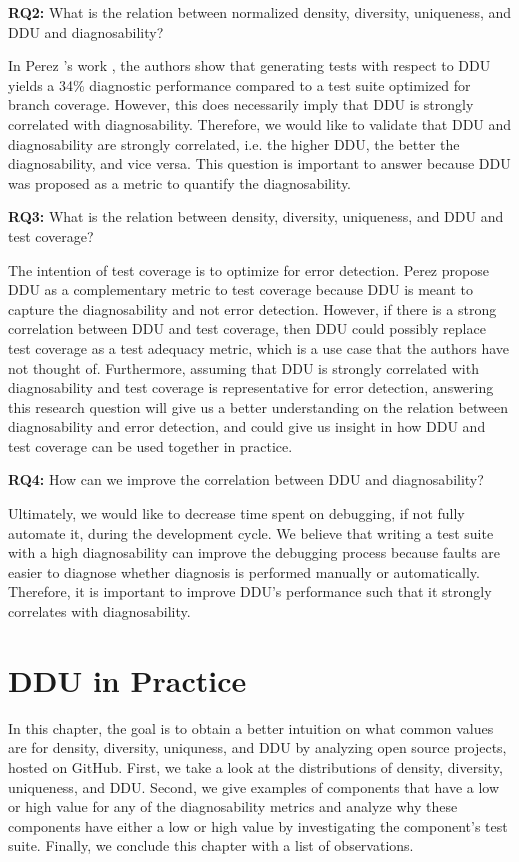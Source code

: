 \documentclass[twoside,a4paper,11pt]{memoir}
\begin{document}
\begin{framed}
\noindent
\textbf{RQ2:} What is the relation between normalized density, diversity, uniqueness, and DDU and diagnosability?
\end{framed}
In Perez \etal's work \cite{DBLP:conf/icse/PerezAD17}, the authors show that generating tests with respect to DDU yields a 34\% diagnostic performance compared to a test suite optimized for branch coverage.
However, this does necessarily imply that DDU is strongly correlated with diagnosability.
Therefore, we would like to validate that DDU and diagnosability are strongly correlated, i.e. the higher DDU, the better the diagnosability, and vice versa.
This question is important to answer because DDU was proposed as a metric to quantify the diagnosability.

\begin{framed}
\noindent
\textbf{RQ3:} What is the relation between density, diversity, uniqueness, and DDU and test coverage?
\end{framed}
The intention of test coverage is to optimize for error detection.
Perez \etal \cite{DBLP:conf/icse/PerezAD17} propose DDU as a complementary metric to test coverage because DDU is meant to capture the diagnosability and not error detection.
However, if there is a strong correlation between DDU and test coverage, then DDU could possibly replace test coverage as a test adequacy metric, which is a use case that the authors have not thought of.
Furthermore, assuming that DDU is strongly correlated with diagnosability and test coverage is representative for error detection, answering this research question will give us a better understanding on the relation between diagnosability and error detection, and could give us insight in how DDU and test coverage can be used together in practice.

\begin{framed}
\noindent
\textbf{RQ4:} How can we improve the correlation between DDU and diagnosability?
\end{framed}
Ultimately, we would like to decrease time spent on debugging, if not fully automate it, during the development cycle.
We believe that writing a test suite with a high diagnosability can improve the debugging process because faults are easier to diagnose whether diagnosis is performed manually or automatically.
Therefore, it is important to improve DDU's performance such that it strongly correlates with diagnosability.

\chapter{DDU in Practice}
\label{ch:rq1}
In this chapter, the goal is to obtain a better intuition on what common values are for density, diversity, uniquness, and DDU by analyzing open source projects, hosted on GitHub.
First, we take a look at the distributions of density, diversity, uniqueness, and DDU.
Second, we give examples of components that have a low or high value for any of the diagnosability metrics and analyze why these components have either a low or high value by investigating the component's test suite.
Finally, we conclude this chapter with a list of observations.
\end{document}
